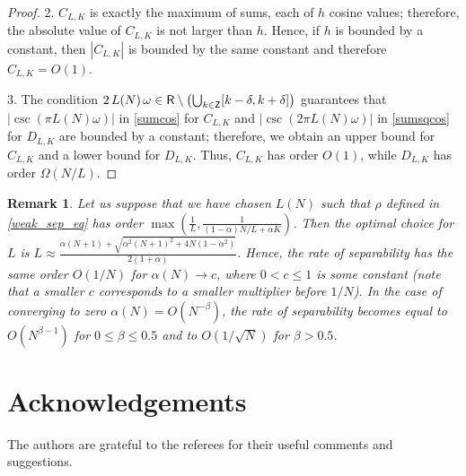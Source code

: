 \documentclass[sii]{ipart}
\newtheorem{remark}{Remark}
\begin{document}
\begin{proof}
    2. $C_{L,K}$ is exactly the maximum of sums, each of $h$ cosine values; therefore, the absolute value of $C_{L,K}$ is not larger than $h$. Hence, if $h$ is bounded by a constant, then $|C_{L,K}|$ is bounded by the same constant and therefore $C_{L,K} = O(1)$.

    3. The condition $2\, L(N)\, \omega \in  \mathsf{R} \setminus \left(\bigcup_{k \in \mathsf{Z}} [k - \delta, k + \delta] \right)$ guarantees that  $|\csc(\pi L(N) \omega)|$ in \eqref{sumcos} for $C_{L,K}$ and $|\csc(2 \pi L(N) \omega)|$ in \eqref{sumsqcos} for $D_{L,K}$ are bounded by a constant; therefore, we obtain an upper bound for $C_{L,K}$ and a lower bound for $D_{L,K}$. Thus, $C_{L, K}$ has order $O(1)$, while $D_{L, K}$ has order $\Omega(N/L)$.
\end{proof}

\begin{remark}
	Let us suppose that we have chosen $L(N)$ such that $\rho$ defined in \eqref{weak_sep_eq} has order $\max\left(\frac{1}{L}, \frac{1}{(1-\alpha)N/L+\alpha K}\right)$. Then the optimal choice for $L$ is $L \approx \frac{\alpha(N + 1) + \sqrt{\alpha^2(N+1)^2 + 4N(1  - \alpha^2)}}{2(1 + \alpha)}$.
Hence, the rate of separability has the same order $O(1/N)$  for $\alpha(N) \to c$, where $0<c\le 1$ is some constant (note that a smaller $c$ corresponds to a smaller multiplier before $1/N$). In the case of converging to zero $\alpha(N) = O(N^{-\beta})$, the rate of separability becomes equal to $O(N^{\beta - 1})$ for $0 \le \beta \le 0.5$ and to $O(1/\sqrt{N})$ for $\beta > 0.5$.
\end{remark}

\section*{Acknowledgements}
The authors are grateful to the referees for their useful comments and suggestions.

\



\end{document}
